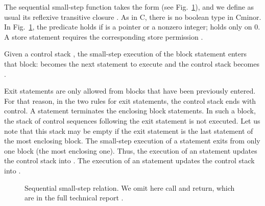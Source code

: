 \documentclass{llncs}
\newcommand{\cminor}{Cminor}
\newcommand{\infrencee}[2]{
\inference{\hspace*{-8pt}#1\hspace*{-8pt}}{\hspace*{-8pt} #2\hspace*{-8pt}}}
\newcommand{\tyface}[1]{\ensuremath{\mathsf{#1}}}
\newcommand{\Sassign}[2]{#1:=#2}
\newcommand{\Sstore}[3]{\tyface{[}#2\tyface{]}_{#1}\tyface{:=}#3}
\newcommand{\Sif}[3]{\tyface{if}\,#1\,\tyface{then}\,#2\,\tyface{else}\,#3}
\newcommand{\Sloop}[1]{\tyface{loop}\,#1}
\newcommand{\Sblock}[1]{\tyface{block}\,#1}
\newcommand{\Sexit}[1]{\tyface{exit}\,#1}
\newcommand{\Sseq}[2]{#1;#2}
\newcommand{\Sskip}{\tyface{skip}}
\newcommand{\Kseq}[2]{#1\cdot #2}
\newcommand{\Kblock}[1]{\tyface{Kblock\,#1}}
\newcommand{\Cont}[2]{(#1,#2)}
\newcommand{\ctl}{\kappa} \newcommand{\stmt}{\tyface{stmt}}
\newcommand{\fmap}{\Psi}
\newcommand{\infootprint}[4]{#4 \vdash \tyface{#3}_#2\, #1}
\newcommand{\evalexp}[3]{\fmap; #1 \vdash #2 \Downarrow #3}
\newcommand{\storev}[5]{#5=#2[#3\stackrel{#1}{:=}#4]}
\newcommand{\step}[2]{\fmap \vdash #1\:\longmapsto\:#2}
\begin{document}
The sequential small-step function takes the
form  (see Fig.~\ref{fig-step}),
and we define as usual its 
reflexive transitive closure .
As in C, there is no boolean type in \cminor.
In Fig.~\ref{fig-step}, the predicate  
holds if  is a pointer or a nonzero integer; 
 holds only on 0.
A store statement  requires the corresponding 
store permission .

Given a control stack , the small-step execution of the block 
statement  enters that block:  becomes the next statement to execute and the
control stack becomes .

Exit statements are only allowed from blocks that have been previously entered.
For that reason, in the two rules for exit statements, the control stack ends with
 control.
A statement  terminates the  enclosing block statements.
In such a block, the stack of control sequences  following the
exit statement is not executed. 
Let us note that this stack may be empty if the exit statement is the last statement
of the most enclosing block.
The small-step execution of a statement 
exits from only one block (the most enclosing one).
Thus, the execution of an  statement updates the control stack
 into .
The execution of an  statement updates the control stack
 into .



\begin{figure}[t]
\caption{Sequential small-step relation.  We omit here call and return, which are in the full technical report \cite{appel07:tr}.}
\label{fig-step}
\end{figure}
\end{document}
